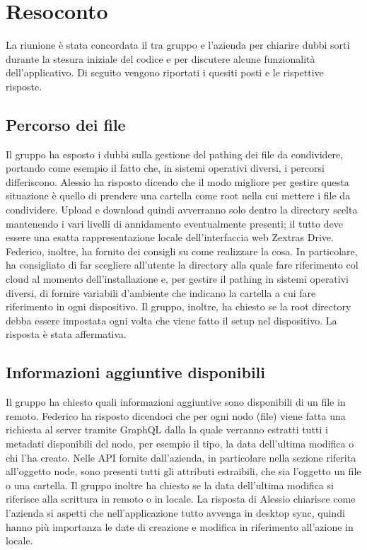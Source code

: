 \section{Resoconto}

La riunione è stata concordata il tra gruppo \textit{\Gruppo{}} e l'azienda per chiarire dubbi sorti durante la stesura iniziale del codice e per discutere alcune funzionalità dell'applicativo. Di seguito vengono riportati i quesiti posti e le rispettive risposte. 

\subsection{Percorso dei file}
Il gruppo ha esposto i dubbi sulla gestione del pathing dei file da condividere, portando come esempio il fatto che, in sistemi operativi diversi, i percorsi differiscono. Alessio ha risposto dicendo che il modo migliore per gestire questa situazione è quello di prendere una cartella come root nella cui mettere i file da condividere. Upload e download quindi avverranno solo dentro la directory scelta mantenendo i vari livelli di annidamento eventualmente presenti; il tutto deve essere una esatta rappresentazione locale dell'interfaccia web Zextras Drive. Federico, inoltre, ha fornito dei consigli su come realizzare la cosa. In particolare, ha consigliato di far scegliere all'utente la directory alla quale fare riferimento col cloud al momento dell'installazione e, per gestire il pathing in sistemi operativi diversi, di fornire variabili d'ambiente che indicano la cartella a cui fare riferimento in ogni dispositivo. Il gruppo, inoltre, ha chiesto se la root directory debba essere impostata ogni volta che viene fatto il setup nel dispositivo. La risposta è stata affermativa. 
\subsection{Informazioni aggiuntive disponibili}
Il gruppo ha chiesto quali informazioni aggiuntive sono disponibili di un file in remoto. Federico ha risposto dicendoci che per ogni nodo (file) viene fatta una richiesta al server tramite GraphQL dalla la quale verranno estratti tutti i metadati disponibili del nodo, per esempio il tipo, la data dell'ultima modifica o chi l'ha creato. Nelle API fornite dall'azienda, in particolare nella sezione riferita all'oggetto node, sono presenti tutti gli attributi estraibili, che sia l'oggetto un file o una cartella. Il gruppo inoltre ha chiesto se la data dell'ultima modifica si riferisce alla scrittura in remoto o in locale. La risposta di Alessio chiarisce come l'azienda si aspetti che nell'applicazione tutto avvenga in desktop sync, quindi hanno più importanza le date di creazione e modifica in riferimento all'azione in locale. 
